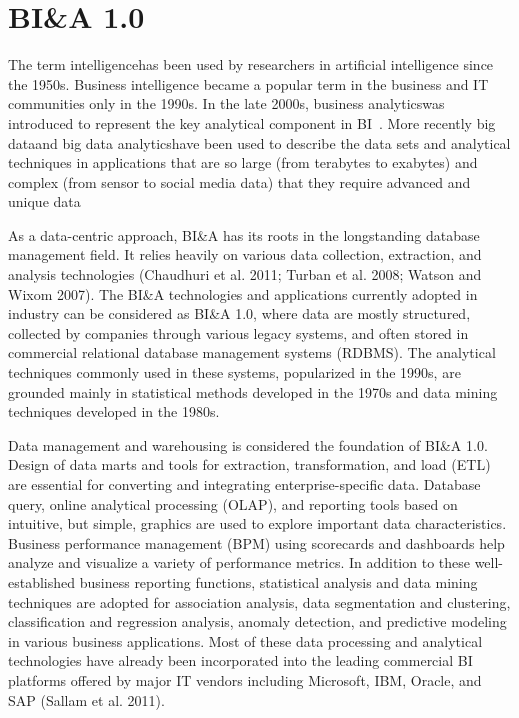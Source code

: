 \section{BI\&A 1.0}
The term intelligencehas been used by researchers in
artificial intelligence since the 1950s. Business intelligence
became a popular term in the business and IT communities
only in the 1990s. In the late 2000s, business analyticswas
introduced to represent the key analytical component in BI~\cite{davenport:2006}. More recently big dataand big data
analyticshave been used to describe the data sets and analytical techniques in applications that are so large (from
terabytes to exabytes) and complex (from sensor to social
media data) that they require advanced and unique data

As a data-centric approach, BI\&A has its roots in the longstanding database management field. It relies heavily on
various data collection, extraction, and analysis technologies
(Chaudhuri et al. 2011; Turban et al. 2008; Watson and
Wixom 2007). The BI\&A technologies and applications
currently adopted in industry can be considered as BI\&A 1.0,
where data are mostly structured, collected by companies
through various legacy systems, and often stored in commercial relational database management systems (RDBMS). The
analytical techniques commonly used in these systems,
popularized in the 1990s, are grounded mainly in statistical
methods developed in the 1970s and data mining techniques
developed in the 1980s.

Data management and warehousing is considered the foundation of BI\&A 1.0. Design of data marts and tools for
extraction, transformation, and load (ETL) are essential for
converting and integrating enterprise-specific data. Database
query, online analytical processing (OLAP), and reporting
tools based on intuitive, but simple, graphics are used to
explore important data characteristics. Business performance
management (BPM) using scorecards and dashboards help
analyze and visualize a variety of performance metrics. In
addition to these well-established business reporting functions, statistical analysis and data mining techniques are
adopted for association analysis, data segmentation and
clustering, classification and regression analysis, anomaly
detection, and predictive modeling in various business applications. Most of these data processing and analytical technologies have already been incorporated into the leading commercial BI platforms offered by major IT vendors including
Microsoft, IBM, Oracle, and SAP (Sallam et al. 2011).


